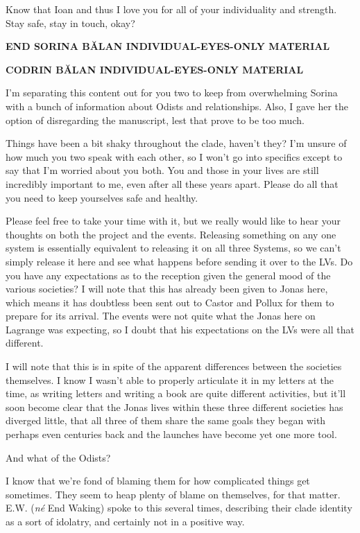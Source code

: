 Know that Ioan and thus I love you for all of your individuality and strength. Stay safe, stay in touch, okay?

\begin{center}
\textbf{END SORINA BĂLAN INDIVIDUAL-EYES-ONLY MATERIAL}
\end{center}

\begin{center}
\textbf{CODRIN BĂLAN INDIVIDUAL-EYES-ONLY MATERIAL}
\end{center}

I'm separating this content out for you two to keep from overwhelming Sorina with a bunch of information about Odists and relationships. Also, I gave her the option of disregarding the manuscript, lest that prove to be too much.

Things have been a bit shaky throughout the clade, haven't they? I'm unsure of how much you two speak with each other, so I won't go into specifics except to say that I'm worried about you both. You and those in your lives are still incredibly important to me, even after all these years apart. Please do all that you need to keep yourselves safe and healthy.

Please feel free to take your time with it, but we really would like to hear your thoughts on both the project and the events. Releasing something on any one system is essentially equivalent to releasing it on all three Systems, so we can't simply release it here and see what happens before sending it over to the LVs. Do you have any expectations as to the reception given the general mood of the various societies? I will note that this has already been given to Jonas here, which means it has doubtless been sent out to Castor and Pollux for them to prepare for its arrival. The events were not quite what the Jonas here on Lagrange was expecting, so I doubt that his expectations on the LVs were all that different.

I will note that this is in spite of the apparent differences between the societies themselves. I know I wasn't able to properly articulate it in my letters at the time, as writing letters and writing a book are quite different activities, but it'll soon become clear that the Jonas lives within these three different societies has diverged little, that all three of them share the same goals they began with perhaps even centuries back and the launches have become yet one more tool.

And what of the Odists?

I know that we're fond of blaming them for how complicated things get sometimes. They seem to heap plenty of blame on themselves, for that matter. E.W. (\emph{né} End Waking) spoke to this several times, describing their clade identity as a sort of idolatry, and certainly not in a positive way.

